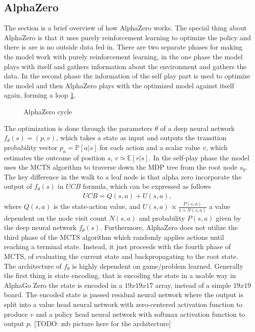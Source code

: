 \subsection{AlphaZero}
The section is a brief overview of how AlphaZero \cite{alphazero} works. The
special thing about AlphaZero is that it uses purely reinforcement learning
to optimize the policy and there is are is no outside data fed in. There are
two separate phases for making the model work with purely
reinforcement learning, in the one phase the model plays with itself and
gathers information about the environment and gathers the data. In the second
phase the information of the self play part is used to optimize the model and
then AlphaZero plays with the optimized model against itself again, forming a
loop \ref{fig: 5}.
\begin{figure}[htb!]
    \centering
    \caption{AlphaZero cycle \label{fig: 5}}
\end{figure}
The optimization is done through the parameters $\theta$ of a deep neural
network $f_\theta(s) = (p, v)$, which takes a state as input and outputs the
transition probability vector $p_a = \mathbb{P}[a|s]$ for each action and a
scalar value $v$, which estimates the outcome of position $s$, $v \simeq
\mathbb{E}[r|s]$.
In the self-play phase the model uses the MCTS algorithm to traverse down the
MDP tree from the root node $s_0$. The key difference in the walk to a leaf
node is that alpha zero incorporate the output of $f_\theta(s)$ in $UCB$
formula, which can be expressed as follows
\begin{align}
    UCB = Q(s,a) + U(s,a),
\end{align}
where $Q(s,a)$ is the state-action value, and $U(s,a)\propto
\frac{P(s,a)}{1+N(s,a)}$ a value dependent on the node visit count $N(s, a)$
and probability $P(s, a)$ given by the deep neural network $f_\theta(s)$.
Furthermore, AlphaZero does not utilize the third phase of the MCTS algorithm
which randomly applies actions until reaching a terminal state. Instead, it
just proceeds with the fourth phase of MCTS, of evaluating the current state
and backpropagating to the root state. The architecture of $f_\theta$ is
highly dependent on game/problem learned. Generally the first thing is state
encoding, that is encoding the state in a usable way in AlphaGo
Zero\cite{alphazero} the state is encoded in a $19x19x17$ array, instead of a
simple $19x19$ board. The encoded state is passed residual neural network
where the output is split into a value head neural network with zero-centered
activation function to produce $v$ and a policy head neural network with
softmax activation function to output $p$.
[TODO: mb picture here for the architecture]

